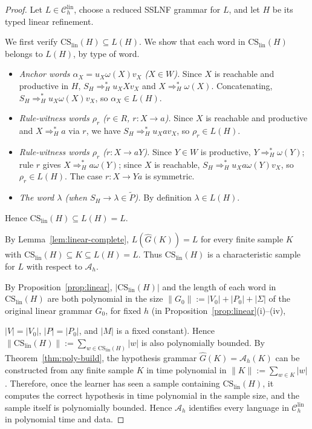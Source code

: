 \documentclass[11pt,a4paper]{article}
\newcommand{\CS}{\mathrm{CS}}
\newcommand{\lin}{\mathrm{lin}}
\newcommand{\Clin}[1]{\mathcal C_{#1}^{\lin}}
\begin{document}
\begin{proof}
Let $L\in\Clin{h}$, choose a reduced SSLNF grammar for $L$, and let $H$ be its
typed linear refinement.

We first verify $\CS_{\lin}(H)\subseteq L(H)$.
We show that each word in $\CS_{\lin}(H)$ belongs to $L(H)$, by type of word.
\begin{itemize}[nosep,leftmargin=2.2em]
  \item \emph{Anchor words $\alpha_X=u_X\omega(X)v_X$ ($X\in W$).}
    Since $X$ is reachable and productive in $H$,
    $S_H\Rightarrow_H^* u_XXv_X$ and $X\Rightarrow_H^*\omega(X)$.
    Concatenating, $S_H\Rightarrow_H^* u_X\omega(X)v_X$, so $\alpha_X\in L(H)$.
  \item \emph{Rule-witness words $\rho_r$ ($r\in R$, $r:X\to a$).}
    Since $X$ is reachable and productive and $X\Rightarrow_H^* a$ via $r$,
    we have $S_H\Rightarrow_H^* u_Xav_X$, so $\rho_r\in L(H)$.
  \item \emph{Rule-witness words $\rho_r$ ($r:X\to aY$).}
    Since $Y\in W$ is productive, $Y\Rightarrow_H^*\omega(Y)$; rule $r$ gives
    $X\Rightarrow_H^* a\omega(Y)$; since $X$ is reachable,
    $S_H\Rightarrow_H^* u_Xa\omega(Y)v_X$, so $\rho_r\in L(H)$.
    The case $r:X\to Ya$ is symmetric.
  \item \emph{The word $\lambda$ (when $S_H\to\lambda\in\widetilde P$).}
    By definition $\lambda\in L(H)$.
\end{itemize}
Hence $\CS_{\lin}(H)\subseteq L(H)=L$.

By Lemma~\ref{lem:linear-complete}, $L(\hat G(K))=L$ for every finite sample $K$
with $\CS_{\lin}(H)\subseteq K\subseteq L(H)=L$.
Thus $\CS_{\lin}(H)$ is a characteristic sample for $L$ with respect to $\mathcal A_h$.

By Proposition~\ref{prop:linear}, $|\CS_{\lin}(H)|$ and the length of each word in
$\CS_{\lin}(H)$ are both polynomial in the size
$\|G_0\|:=|V_0|+|P_0|+|\Sigma|$ of the original linear grammar $G_0$, for fixed $h$
(in Proposition~\ref{prop:linear}(i)--(iv), 

$|V|=|V_0|$, $|P|=|P_0|$, and $|M|$ is
a fixed constant).
Hence $\|\CS_{\lin}(H)\|:=\sum_{w\in\CS_{\lin}(H)}|w|$ is also polynomially bounded.
By Theorem~\ref{thm:poly-build}, the hypothesis grammar $\hat G(K)=\mathcal A_h(K)$
can be constructed from any finite sample $K$ in time polynomial in
$\|K\|:=\sum_{w\in K}|w|$.
Therefore, once the learner has seen a sample containing $\CS_{\lin}(H)$, it computes
the correct hypothesis in time polynomial in the sample size, and the sample itself is
polynomially bounded.
Hence $\mathcal A_h$ identifies every language in $\Clin{h}$ in polynomial time and data.
\end{proof}
\end{document}
